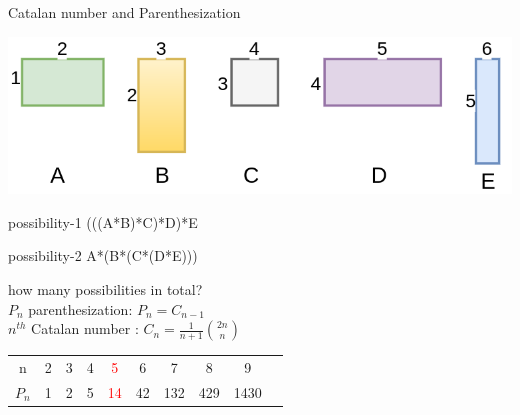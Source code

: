 \documentclass[10pts]{beamer}
\begin{document}
	   	\begin{frame}[t]{Catalan number and Parenthesization}
	   		\begin{center}
              	\includegraphics[scale =0.2]{chain_matrix_numero.png}
	   		\end{center}
	   		
	   	
	   		\begin{center}
	   		possibility-1	(((A*B)*C)*D)*E \hspace{80pt}
	   			  
	   		possibility-2	A*(B*(C*(D*E))) \hspace{80pt}
	   				 			
	   		\end{center}
	   		 	how many possibilities in total?\\
	   	
	   		   $P_n$ parenthesization: $P_n = C_{n-1}$\\\vspace{3pt}
	           $n^{th}$ Catalan number : $C_n = \frac{1}{n+1} \binom{2n}{n}$ \\
	     
	   	\begin{center}
	   	\begin{tabular}{c c c c c c c c c c}
	   		   n  & 2 & 3 & 4 & \textcolor{red}{5} & 6 & 7 & 8 & 9\\ 
	   		$P_n$ & 1 & 2 & 5 & \textcolor{red}{14} & 42 & 132 & 429 & 1430
	   	\end{tabular} 
	   	\end{center}
	   		
	   		
	   	\end{frame} 	
	 
\end{document}
